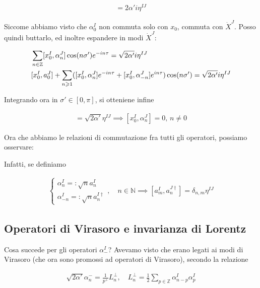 \documentclass{report}
\begin{document}
\begin{align}
    [x_0^I + \sqrt{2\alpha'}\alpha_0^I, \dot{X}^J (\tau, \sigma')] = 2\alpha' i \eta^{IJ}
\end{align}

Siccome abbiamo visto che \(\alpha_0^I\) non commuta solo con \(x_0\), commuta con \(\dot{X}^J\). Posso quindi buttarlo, ed inoltre espandere in modi \(\dot{X}^J\): 

\begin{align}
    &\sum_{n\in \mathbb{Z}}[x_0^I, \alpha_n^J]\cos(n\sigma') e^{-in\tau} = \sqrt{2\alpha'}i\eta^{IJ} \notag \\
    & [x_0^I, a_0^J] + \sum_{n \geq 1}([x_0^I, \alpha_n^J] e^{-in\tau} + [x_0^I, \alpha_{-n}^J] e^{in\tau})\cos(n\sigma') = \sqrt{2\alpha'}i\eta^{IJ}
\end{align}

Integrando ora in \(\sigma' \in [0, \pi]\), si otteniene infine 

\begin{align}
    [x_0^I, \alpha_0^J] = \sqrt{2\alpha'}\eta^{IJ} \implies [x_0^I, \alpha_n^J] = 0, \, n \neq 0
\end{align}

Ora che abbiamo le relazioni di commutazione fra tutti gli operatori, possiamo osservare: 


Infatti, se definiamo 

\begin{align}
    \begin{cases}
        \alpha^I_n =: \sqrt{n}a^I_n \\
        \alpha^I_{-n} =: \sqrt{n}a^{I\dagger}_n
    \end{cases}, \quad n \in \mathbb{N} \implies [a_m^I, a_n^{J\dagger}] = \delta_{n,m}\eta^{IJ}
\end{align}

\subsection{Operatori di Virasoro e invarianza di Lorentz}

Cosa succede per gli operatori \(\alpha^I_-\)? Avevamo visto che erano legati ai modi di Virasoro (che ora sono promossi ad operatori di Virasoro), secondo la relazione 

\begin{align}
    \sqrt{2\alpha'}\alpha^-_n = \frac{1}{p^+}L_n^\perp, \quad L_n^\perp = \frac{1}{2}\sum_{p\in\mathbb{Z}}\alpha^I_{n-p}\alpha^I_p 
\end{align}
\end{document}
